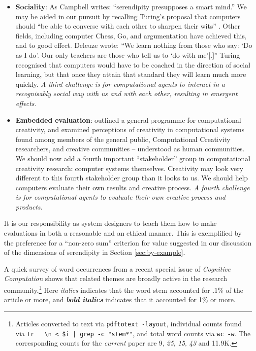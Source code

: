 \begin{itemize}
\item \textbf{Sociality}: As Campbell \citeyear{campbell} writes:
  ``serendipity presupposes a smart mind.''  We may be aided in our
  pursuit by recalling Turing's proposal that computers should ``be
  able to converse with each other to sharpen their wits''
  \cite{turing-intelligent}.  Other fields, including computer Chess,
  Go, and argumentation have achieved this, and to good effect.
  Deleuze \citeyear[p. 26]{deleuze1994difference} wrote: ``We learn
  nothing from those who say: `Do as I do'. Our only teachers are
  those who tell us to `do with me'[.]''  Turing recognised that
  computers would have to be coached in the direction of social
  learning, but that once they attain that standard they will learn
  much more quickly.  \emph{A third challenge is for computational
    agents to interact in a recognisably social way with us and with
    each other, resulting in emergent effects.}
\end{itemize}

\begin{itemize}
\item \textbf{Embedded evaluation}:
   outlined a general programme
  for computational creativity, and examined perceptions of creativity
  in computational systems found among members of the general public,
  Computational Creativity researchers, and creative communities --
  understood as human communities.  We should now add a fourth
  important ``stakeholder'' group in computational creativity
  research: computer systems themselves.  Creativity may look very
  different to this fourth stakeholder group than it looks to us.  We
  should help computers evaluate their own results and creative
  process.  \emph{A fourth challenge is for computational agents to
    evaluate their own creative process and products.}
\end{itemize}

It is our responsibility as system designers to teach them how to make
evaluations in both a reasonable and an ethical manner.  This is
exemplified by the preference for a ``non-zero sum'' criterion for
value suggested in our discussion of the dimensions of serendipity in
Section \ref{sec:by-example}.

A quick survey of word occurrences from a recent special issue of
\emph{Cognitive Computation} shows that related themes are broadly
active in the research community.\footnote{Articles converted to text
  via {\tt pdftotext -layout}, individual counts found via {\tt tr \textquotesingle~\textquotesingle~\textquotesingle\textbackslash n\textquotesingle~< \$i | grep -c "stem*"}, and total word counts via {\tt wc -w}.  The
corresponding counts for the \emph{current} paper are 9, \emph{25}, \emph{15}, \emph{43} and 11.9K.}  Here
\emph{italics} indicates that the word stem accounted for .1\% of the
article or more, and \textbf{\emph{bold italics}} indicates that it
accounted for 1\% or more.

